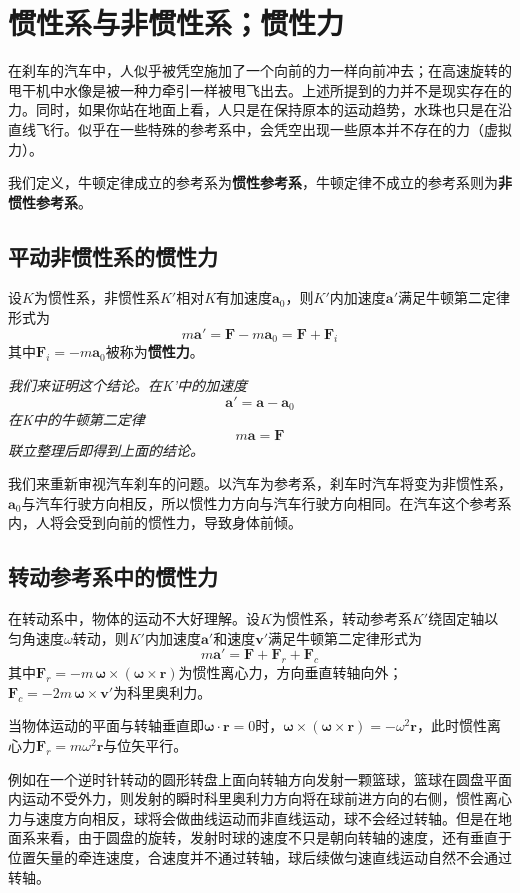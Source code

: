 \section{惯性系与非惯性系；惯性力}
在刹车的汽车中，人似乎被凭空施加了一个向前的力一样向前冲去；在高速旋转的甩干机中水像是被一种力牵引一样被甩飞出去。上述所提到的力并不是现实存在的力。同时，如果你站在地面上看，人只是在保持原本的运动趋势，水珠也只是在沿直线飞行。似乎在一些特殊的参考系中，会凭空出现一些原本并不存在的力（虚拟力）。

我们定义，牛顿定律成立的参考系为\textbf{惯性参考系}，牛顿定律不成立的参考系则为\textbf{非惯性参考系}。
\subsection{平动非惯性系的惯性力}
设$K$为惯性系，非惯性系$K'$相对$K$有加速度$\mathbf{a}_0$，则$K'$内加速度$\mathbf{a} '$满足牛顿第二定律形式为
\[
m \mathbf{a}' = \mathbf{F} - m \mathbf{a}_0 = \mathbf{F} +\mathbf{F}_i
\]
其中$\mathbf{F}_i = - m \mathbf{a}_0$被称为\textbf{惯性力}。

\textit{我们来证明这个结论。在K'中的加速度}
\[
\mathbf{a}' = \mathbf{a} - \mathbf{a}_0
\]
\textit{在K中的牛顿第二定律}
\[
m \mathbf{a} = \mathbf{F}
\]
\textit{联立整理后即得到上面的结论。}

我们来重新审视汽车刹车的问题。以汽车为参考系，刹车时汽车将变为非惯性系，$\mathbf{a}_0$与汽车行驶方向相反，所以惯性力方向与汽车行驶方向相同。在汽车这个参考系内，人将会受到向前的惯性力，导致身体前倾。

\subsection{转动参考系中的惯性力}
在转动系中，物体的运动不大好理解。设$K$为惯性系，转动参考系$K'$绕固定轴以匀角速度$\omega$转动，则$K'$内加速度$\mathbf{a} '$和速度$\mathbf{v}'$满足牛顿第二定律形式为
\[
m \mathbf{a}' = \mathbf{F} + \mathbf{F}_r +  \mathbf{F}_c
\]
其中$\mathbf{F}_r = - m \,\boldsymbol{\omega} \times (\boldsymbol{\omega} \times \mathbf{r})$为惯性离心力，方向垂直转轴向外；
 $\mathbf{F}_c=  - 2m \,\boldsymbol{\omega} \times \mathbf{v}' $为科里奥利力。

当物体运动的平面与转轴垂直即$\boldsymbol{\omega} \cdot \mathbf{r} = 0$时，$\boldsymbol{\omega} \times (\boldsymbol{\omega} \times \mathbf{r}) = -\omega^2 \mathbf{r}$，此时惯性离心力$\mathbf{F}_r = m\omega^2 \mathbf{r}$与位矢平行。

例如在一个逆时针转动的圆形转盘上面向转轴方向发射一颗篮球，篮球在圆盘平面内运动不受外力，则发射的瞬时科里奥利力方向将在球前进方向的右侧，惯性离心力与速度方向相反，球将会做曲线运动而非直线运动，球不会经过转轴。但是在地面系来看，由于圆盘的旋转，发射时球的速度不只是朝向转轴的速度，还有垂直于位置矢量的牵连速度，合速度并不通过转轴，球后续做匀速直线运动自然不会通过转轴。


